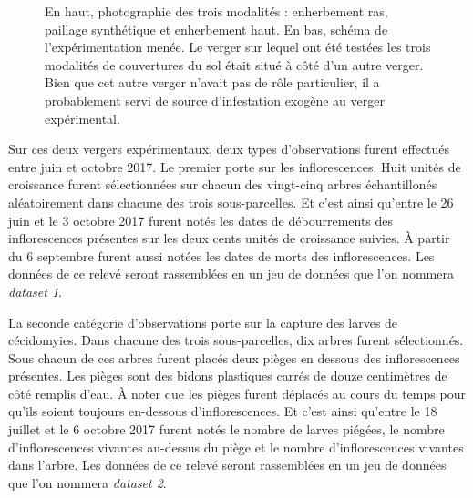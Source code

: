 \begin{figure}[ht]
 \caption{En haut, photographie des trois modalités : enherbement ras, paillage synthétique et enherbement haut.
 En bas, schéma de l'expérimentation menée.  Le verger sur lequel ont été testées les trois modalités de couvertures du sol était situé à côté d'un autre verger. Bien que cet autre verger n'avait pas de rôle particulier, il a probablement servi de source d'infestation exogène au verger expérimental.}
 \label{fig:exp}
\end{figure}

Sur ces deux vergers expérimentaux, deux types d'observations furent effectués entre juin et octobre 2017. 
Le premier porte sur les inflorescences. 
Huit unités de croissance furent sélectionnées sur chacun des vingt-cinq arbres échantillonés aléatoirement dans chacune des trois sous-parcelles.
Et c'est ainsi qu'entre le 26 juin et le 3 octobre 2017 furent notés les dates de débourrements des inflorescences présentes sur les deux cents unités de croissance suivies.
À partir du 6 septembre furent aussi notées les dates de morts des inflorescences. 
Les données de ce relevé seront rassemblées en un jeu de données que l'on nommera \emph{dataset 1}.

La seconde catégorie d'observations porte sur la capture des larves de cécidomyies.
Dans chacune des trois sous-parcelles, dix arbres furent sélectionnés. 
Sous chacun de ces arbres furent placés deux pièges en dessous des inflorescences présentes.
Les pièges sont des bidons plastiques carrés de douze centimètres de côté remplis d'eau.
À noter que les pièges furent déplacés au cours du temps pour qu'ils soient toujours en-dessous d'inflorescences.
Et c'est ainsi qu'entre le 18 juillet et le 6 octobre 2017 furent notés le nombre de larves piégées, le nombre d'inflorescences vivantes au-dessus du piège et le nombre d'inflorescences vivantes dans l'arbre.
Les données de ce relevé seront rassemblées en un jeu de données que l'on nommera \emph{dataset 2}.

